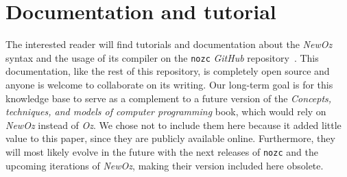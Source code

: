 \section{Documentation and tutorial}\label{sec:appendix-doc}
The interested reader will find tutorials and documentation about the \textit{NewOz} syntax and the usage of its compiler on the \texttt{nozc} \textit{GitHub} repository~\cite{NozcGitHub}.
This documentation, like the rest of this repository, is completely open source and anyone is welcome to collaborate on its writing.
Our long-term goal is for this knowledge base to serve as a complement to a future version of the \textit{Concepts, techniques, and models of computer programming} book, which would rely on \textit{NewOz} instead of \textit{Oz}.
We chose not to include them here because it added little value to this paper, since they are publicly available online.
Furthermore, they will most likely evolve in the future with the next releases of \texttt{nozc} and the upcoming iterations of \textit{NewOz}, making their version included here obsolete.